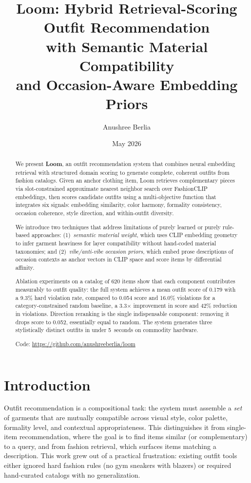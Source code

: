 \documentclass[10pt,twocolumn]{article}
\title{Loom: Hybrid Retrieval-Scoring Outfit Recommendation\\with Semantic Material Compatibility\\and Occasion-Aware Embedding Priors}
\author{
  Anushree Berlia
}
\date{May 2026}
\begin{document}
\maketitle

\begin{abstract}
We present \textbf{Loom}, an outfit recommendation system that combines
neural embedding retrieval with structured domain scoring to generate
complete, coherent outfits from fashion catalogs.  Given an anchor clothing
item, Loom retrieves complementary pieces via slot-constrained approximate
nearest neighbor search over FashionCLIP embeddings, then scores candidate
outfits using a multi-objective function that integrates six signals:
embedding similarity, color harmony, formality consistency, occasion
coherence, style direction, and within-outfit diversity.

We introduce two techniques that address limitations of purely learned
or purely rule-based approaches:
(1)~\emph{semantic material weight}, which uses CLIP embedding geometry to
infer garment heaviness for layer compatibility without hand-coded material
taxonomies; and
(2)~\emph{vibe/anti-vibe occasion priors}, which embed prose descriptions of
occasion contexts as anchor vectors in CLIP space and score items by
differential affinity.

Ablation experiments on a catalog of 620 items show that each
component contributes measurably to outfit quality: the full system achieves
a mean outfit score of 0.179 with a 9.3\% hard violation rate, compared to
0.054 score and 16.0\% violations for a category-constrained random
baseline, a 3.3$\times$ improvement in score and 42\% reduction in
violations.  Direction reranking is the single indispensable component:
removing it drops score to 0.052, essentially equal to random.  The system
generates three stylistically distinct outfits in under 5~seconds on
commodity hardware.

\smallskip\noindent
Code: \url{https://github.com/anushreeberlia/loom}
\end{abstract}

\section{Introduction}
\label{sec:intro}

Outfit recommendation is a compositional task: the system must assemble a
\emph{set} of garments that are mutually compatible across visual style,
color palette, formality level, and contextual appropriateness.  This
distinguishes it from single-item recommendation, where the goal is to find
items similar (or complementary) to a query, and from fashion retrieval,
which surfaces items matching a description.  This work grew out of a
practical frustration: existing outfit tools either ignored hard fashion
rules (no gym sneakers with blazers) or required hand-curated catalogs
with no generalization.
\end{document}
